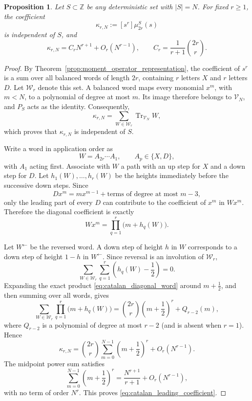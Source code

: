 \documentclass[10pt,a4paper]{amsart}
\newtheorem{proposition}{Proposition}
\begin{document}
\begin{proposition}
\label{prop:catalan}
Let \(S\subset\mathbb Z\) be any deterministic set with \(|S|=N\).  For fixed
\(r\geq1\), the coefficient
\[
    \kappa_{r,N}:=[s^r]\mu_{2r}^S(s)
\]
is independent of \(S\), and
\begin{equation}
    \kappa_{r,N}
    =
    C_rN^{r+1}+O_r(N^{r-1}),
    \qquad
    C_r=\frac{1}{r+1}\binom{2r}{r}.
    \label{eq:catalan_leading_coefficient}
\end{equation}
\end{proposition}

\begin{proof}
By Theorem~\ref{prop:moment_operator_representation}, the coefficient of
\(s^r\) is a sum over all balanced words of length \(2r\), containing \(r\)
letters \(X\) and \(r\) letters \(D\).  Let \(\mathcal W_r\) denote this set.
A balanced word maps every monomial \(x^m\), with \(m<N\), to a polynomial of
degree at most \(m\).  Its image therefore belongs to \(\mathcal V_N\), and
\(P_S\) acts as the identity.  Consequently,
\begin{equation}
    \kappa_{r,N}
    =
    \sum_{W\in\mathcal W_r}
    \operatorname{Tr}_{\mathcal V_N}W,
    \label{eq:catalan_word_trace_sum}
\end{equation}
which proves that \(\kappa_{r,N}\) is independent of \(S\).

Write a word in application order as
\[
    W=A_{2r}\cdots A_1,
    \qquad
    A_p\in\{X,D\},
\]
with \(A_1\) acting first.  Associate with \(W\) a path with an up step for
\(X\) and a down step for \(D\).  Let
\(h_1(W),\ldots,h_r(W)\) be the heights immediately before the successive down
steps.  Since
\[
    Dx^m=mx^{m-1}+\text{terms of degree at most }m-3,
\]
only the leading part of every \(D\) can contribute to the coefficient of
\(x^m\) in \(Wx^m\).  Therefore the diagonal coefficient is exactly
\begin{equation}
    [x^m]Wx^m
    =
    \prod_{q=1}^r\bigl(m+h_q(W)\bigr).
    \label{eq:catalan_diagonal_word}
\end{equation}

Let \(W^{\leftarrow}\) be the reversed word.  A down step of height \(h\) in
\(W\) corresponds to a down step of height \(1-h\) in
\(W^{\leftarrow}\).  Since reversal is an involution of \(\mathcal W_r\),
\begin{equation}
    \sum_{W\in\mathcal W_r}\sum_{q=1}^r
    \left(h_q(W)-\frac12\right)=0.
    \label{eq:height_reversal_cancellation}
\end{equation}
Expanding the exact product \eqref{eq:catalan_diagonal_word} around
\(m+\tfrac12\), and then summing over all words, gives
\[
    \sum_{W\in\mathcal W_r}
    \prod_{q=1}^r\bigl(m+h_q(W)\bigr)
    =
    \binom{2r}{r}\left(m+\frac12\right)^r
    +Q_{r-2}(m),
\]
where \(Q_{r-2}\) is a polynomial of degree at most \(r-2\) (and is absent
when \(r=1\)).  Hence
\[
    \kappa_{r,N}
    =
    \binom{2r}{r}
    \sum_{m=0}^{N-1}\left(m+\frac12\right)^r
    +O_r(N^{r-1}).
\]
The midpoint power sum satisfies
\[
    \sum_{m=0}^{N-1}\left(m+\frac12\right)^r
    =
    \frac{N^{r+1}}{r+1}+O_r(N^{r-1}),
\]
with no term of order \(N^r\).  This proves
\eqref{eq:catalan_leading_coefficient}.
\end{proof}
\end{document}
